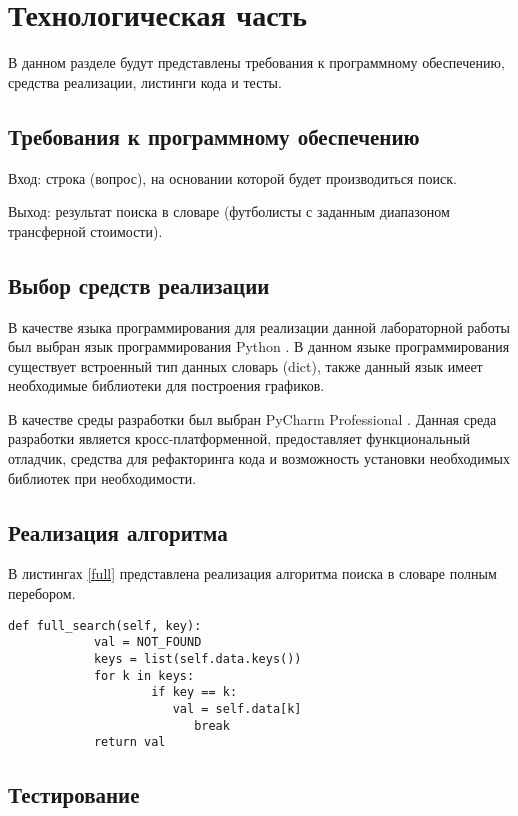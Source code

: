 \chapter{Технологическая часть}
В данном разделе будут представлены требования к программному обеспечению, средства реализации, листинги кода и тесты.

\section{Требования к программному обеспечению}

Вход: строка (вопрос), на основании которой будет производиться поиск.

Выход: результат поиска в словаре (футболисты с заданным диапазоном трансферной стоимости).

\section{Выбор средств реализации}

В качестве языка программирования для реализации данной лабораторной работы был выбран язык программирования Python  \cite{PythonBook}. В данном языке программирования существует встроенный тип данных словарь (dict), также данный язык имеет необходимые библиотеки для построения графиков.

В качестве среды разработки был выбран PyCharm Professional \cite{pycharm}. Данная среда разработки является кросс-платформенной, предоставляет функциональный отладчик, средства для рефакторинга кода и возможность установки необходимых библиотек при необходимости.

\section{Реализация алгоритма}
В листингах \ref{full} представлена реализация алгоритма поиска в словаре полным перебором.

\captionsetup{singlelinecheck = false, justification=raggedright}
\begin{lstlisting}[caption=Реализация алгоритма поискав словаре полным перебором, 
    label={full}]
		def full_search(self, key):
			val = NOT_FOUND
			keys = list(self.data.keys())
			for k in keys:
				    if key == k:
					   val = self.data[k]
                          break
			return val
\end{lstlisting}

\section{Тестирование}

